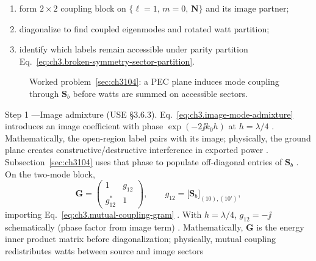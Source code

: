 \begin{enumerate}
\item[(a)] form \(2\times2\) coupling block on \(\{\ell=1,\,m=0,\,\mathbf{N}\}\) and its image partner;
\item[(b)] diagonalize to find coupled eigenmodes and rotated watt partition;
\item[(c)] identify which labels remain accessible under parity partition Eq.~\eqref{eq:ch3.broken-symmetry-sector-partition}.
\end{enumerate}
\begin{figure}[t]
\centering
{}
\caption{Worked problem~\ref{sec:ch3104}: a PEC plane induces mode coupling through $\mathbf{S}_{b}$ before watts are summed on accessible sectors.}
\label{fig:ch3.3104-half-space-mixing}
\end{figure}
Step 1 ---Image admixture (USE §3.6.3). Eq.~\eqref{eq:ch3.image-mode-admixture} introduces an image coefficient with phase \(\exp(-2\jj k_{0}h)\) at \(h=\lambda/4\)
\cite{jackson1999}. Mathematically, the open-region label pairs with its image; physically, the ground plane creates
constructive/destructive interference in exported power \cite{harrington2001}. Subsection~\ref{sec:ch3104} uses that phase to
populate off-diagonal entries of \(\mathbf{S}_{b}\) \cite{hansen1988}.
On the two-mode block,
\begin{equation}
\label{eq:ch3.wp3104-mixing-gram}
\mathbf{G}
=
\begin{pmatrix}
1 & g_{12}\\[2pt]
g_{12}^{*} & 1
\end{pmatrix},
\qquad
g_{12}=\bigl[\mathbf{S}_{b}\bigr]_{(10),(10')},
\end{equation}
importing Eq.~\eqref{eq:ch3.mutual-coupling-gram} \cite{harrington2001}. With \(h=\lambda/4\),
\(g_{12}=-\jj\) schematically (phase factor from image term) \cite{jackson1999}. Mathematically, \(\mathbf{G}\) is the
energy inner product matrix before diagonalization; physically, mutual coupling redistributes watts between source and image sectors

